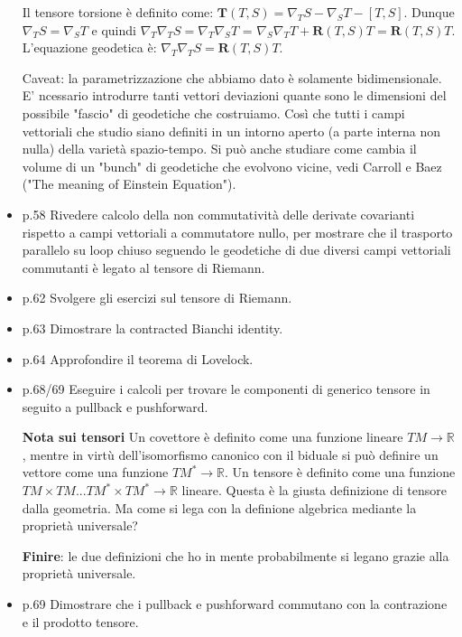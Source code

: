 \documentclass[10pt,a4paper]{article}
\begin{document}
\begin{itemize}
Il tensore torsione è definito come: $\mathbf{T} (T, S) = \nabla_{T} S - \nabla_{S} T - [T, S]$. Dunque $\nabla_{T} S = \nabla_{S} T$ e quindi   $\nabla_{T}\nabla_{T} S = \nabla_{T}\nabla_{S} T$ = $\nabla_{S}\nabla_{T} T + \mathbf{R}(T,S)T = \mathbf{R}(T,S)T$. L'equazione geodetica è:  $\nabla_{T}\nabla_{T} S = \mathbf{R}(T,S)T$.

Caveat: la parametrizzazione che abbiamo dato è solamente bidimensionale. E' ncessario introdurre tanti vettori deviazioni quante sono le dimensioni del possibile "fascio" di geodetiche che costruiamo. Così che tutti i campi vettoriali che studio siano definiti in un intorno aperto (a parte interna non nulla) della varietà spazio-tempo. Si può anche studiare come cambia il volume di un "bunch" di geodetiche che evolvono vicine, vedi Carroll e Baez ("The meaning of Einstein Equation").

\item p.58 Rivedere calcolo della non commutatività delle derivate covarianti rispetto a campi vettoriali a commutatore nullo, per mostrare che il trasporto parallelo su loop chiuso seguendo le geodetiche di due diversi campi vettoriali commutanti è legato al tensore di Riemann.

\item p.62 Svolgere gli esercizi sul tensore di Riemann.

\item p.63 Dimostrare la contracted Bianchi identity.
\item p.64 Approfondire il teorema di Lovelock.

\item p.68/69 Eseguire i calcoli per trovare le componenti di generico tensore in seguito a pullback e pushforward.

\textbf{Nota sui tensori}
Un covettore è definito come una funzione lineare $TM \rightarrow \mathbb{R}$, mentre in virtù dell'isomorfismo canonico con il biduale si può definire un vettore come una funzione $TM^{*} \rightarrow \mathbb{R}$. Un tensore è definito come una funzione $TM \times TM ... TM^{*} \times TM^{*} \rightarrow \mathbb{R}$ lineare. Questa è la giusta definizione di tensore dalla geometria. Ma come si lega con la definione algebrica mediante la proprietà universale?

\textbf{Finire}: le due definizioni che ho in mente probabilmente si legano grazie alla proprietà universale.

\item p.69 Dimostrare che i pullback e pushforward commutano con la contrazione e il prodotto tensore.


\end{itemize}
\end{document}
